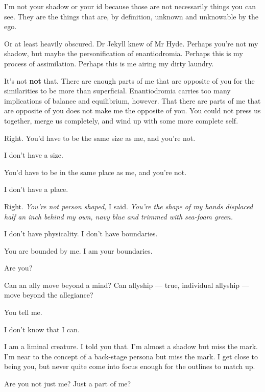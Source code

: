 \begin{paracol}{2}
\begin{leftcolumn}
\begin{ally}
I'm not your shadow or your id because those are not necessarily things you can see. They are the things that are, by definition, unknown and unknowable by the ego.
\end{ally}
Or at least heavily obscured. Dr Jekyll knew of Mr Hyde. Perhaps you're not my shadow, but maybe the personification of enantiodromia. Perhaps this is my process of assimilation. Perhaps this is me airing my dirty laundry.

\begin{ally}
It's not \textbf{not} that. There are enough parts of me that are opposite of you for the similarities to be more than superficial. Enantiodromia carries too many implications of balance and equilibrium, however. That there are parts of me that are opposite of you does not make me the opposite of you. You could not press us together, merge us completely, and wind up with some more complete self.
\end{ally}
Right. You'd have to be the same size as me, and you're not.

\begin{ally}
I don't have a size.
\end{ally}
You'd have to be in the same place as me, and you're not.

\begin{ally}
I don't have a place.
\end{ally}
Right. \emph{You're not person shaped,} I said. \emph{You're the shape of my hands displaced half an inch behind my own, navy blue and trimmed with sea-foam green.}

\begin{ally}
I don't have physicality. I don't have boundaries.
\end{ally}
You are bounded by me. I am your boundaries.

\begin{ally}
Are you?
\end{ally}
Can an ally move beyond a mind? Can allyship --- true, individual allyship --- move beyond the allegiance?

\begin{ally}
You tell me.
\end{ally}
I don't know that I can.

\begin{ally}
I am a liminal creature. I told you that. I'm almost a shadow but miss the mark. I'm near to the concept of a back-stage persona but miss the mark. I get close to being you, but never quite come into focus enough for the outlines to match up.
\end{ally}
Are you not just me? Just a part of me?


\end{leftcolumn}
\end{paracol}
